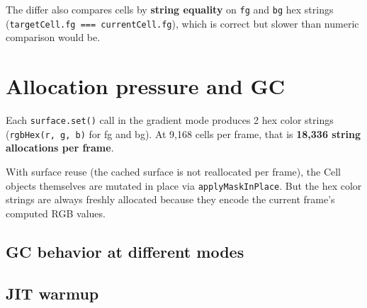 The differ also compares cells by \textbf{string equality} on \texttt{f\allowbreak{}g} and \texttt{b\allowbreak{}g} hex strings (\texttt{t\allowbreak{}a\allowbreak{}r\allowbreak{}g\allowbreak{}e\allowbreak{}t\allowbreak{}C\allowbreak{}e\allowbreak{}l\allowbreak{}l\allowbreak{}.\allowbreak{}f\allowbreak{}g\allowbreak{} \allowbreak{}=\allowbreak{}=\allowbreak{}=\allowbreak{} \allowbreak{}c\allowbreak{}u\allowbreak{}r\allowbreak{}r\allowbreak{}e\allowbreak{}n\allowbreak{}t\allowbreak{}C\allowbreak{}e\allowbreak{}l\allowbreak{}l\allowbreak{}.\allowbreak{}f\allowbreak{}g}), which is correct but slower than numeric comparison would be.

\section{Allocation pressure and GC}\label{record-156-allocation-pressure-and-gc}

Each \texttt{s\allowbreak{}u\allowbreak{}r\allowbreak{}f\allowbreak{}a\allowbreak{}c\allowbreak{}e\allowbreak{}.\allowbreak{}s\allowbreak{}e\allowbreak{}t\allowbreak{}(\allowbreak{})} call in the gradient mode produces 2 hex color strings (\texttt{r\allowbreak{}g\allowbreak{}b\allowbreak{}H\allowbreak{}e\allowbreak{}x\allowbreak{}(\allowbreak{}r\allowbreak{},\allowbreak{} \allowbreak{}g\allowbreak{},\allowbreak{} \allowbreak{}b\allowbreak{})} for fg and bg). At 9,168 cells per frame, that is \textbf{18,336 string allocations per frame}.

With surface reuse (the cached surface is not reallocated per frame), the Cell objects themselves are mutated in place via \texttt{a\allowbreak{}p\allowbreak{}p\allowbreak{}l\allowbreak{}y\allowbreak{}M\allowbreak{}a\allowbreak{}s\allowbreak{}k\allowbreak{}I\allowbreak{}n\allowbreak{}P\allowbreak{}l\allowbreak{}a\allowbreak{}c\allowbreak{}e}. But the hex color strings are always freshly allocated because they encode the current frame's computed RGB values.

\subsection{GC behavior at different modes}\label{record-156-gc-behavior-at-different-modes}



\subsection{JIT warmup}\label{record-156-jit-warmup}

